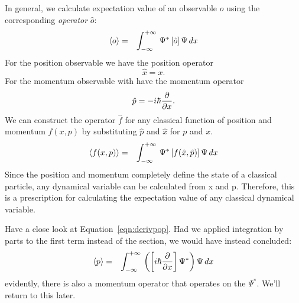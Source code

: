 \documentclass[12pt]{book}
\begin{document}
In general, we calculate expectation value of an observable $o$
using the corresponding {\em operator} $\hat{o}$:
\begin{eqnarray}
\braket{o}  &=& \int_{-\infty}^{+\infty} \, \Psi^* \left[ \hat{o} \right] \Psi \,dx 
\end{eqnarray}
For the position observable we have the position operator 
\begin{equation}
\hat{x} = x.
\end{equation}
For the momentum observable with have the momentum operator 
\begin{equation}
\hat{p} = - i \hbar \frac{\partial}{\partial x}.
\end{equation}
We can construct the operator $\hat{f}$ for any classical function of position and momentum $f(x,p)$ by substituting $\hat{p}$ and $\hat{x}$ for $p$ and $x$.
\begin{eqnarray}
\braket{f(x,p)}  &=& \int_{-\infty}^{+\infty} \, \Psi^* \left[ f(\hat{x},\hat{p}) \right] \Psi \,dx 
\end{eqnarray}
Since the position and momentum completely define the state of a classical particle, any dynamical variable can be calculated from x and p.  Therefore, this is a prescription for calculating the expectation value of any classical dynamical variable.

Have a close look at Equation~\ref{eqn:derivpop}.  Had we applied integration by parts to the first term instead of the section, we would have instead concluded:
\begin{eqnarray*}
\braket{p} &=&  
\int_{-\infty}^{+\infty} \, \left(\left[ i \hbar \frac{\partial}{\partial x}\right] \Psi^* \right) \Psi\,dx 
\end{eqnarray*}
evidently, there is also a momentum operator that operates on the $\Psi^*$.  We'll return to this later.
\end{document}
